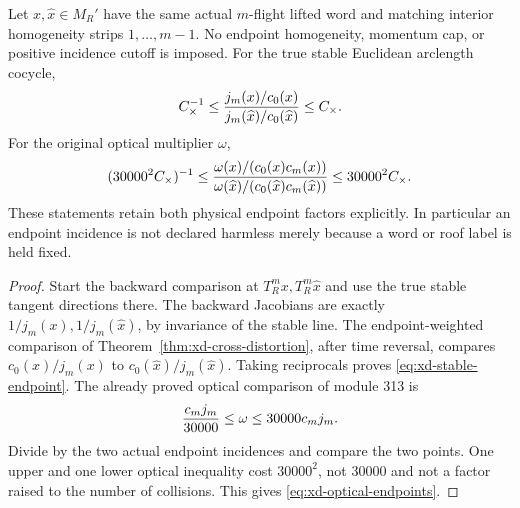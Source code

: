 \begin{corollary}
\label{cor:xd-normalized-cocycles}
Let $x,\widehat x\in M_R'$ have the same actual $m$-flight lifted
word and matching interior homogeneity strips $1,\ldots,m-1$.
No endpoint homogeneity, momentum cap, or positive incidence cutoff
is imposed.  For the true stable Euclidean arclength cocycle,
\begin{equation}\label{eq:xd-stable-endpoint}
 C_\times^{-1}\le
 {j_m(x)/c_0(x)\over j_m(\widehat x)/c_0(\widehat x)}
                                                        \le C_\times.
\end{equation}
For the original optical multiplier $\omega$,
\begin{equation}\label{eq:xd-optical-endpoints}
 (30000^2C_\times)^{-1}\le
 {\omega(x)/(c_0(x)c_m(x))\over
       \omega(\widehat x)/(c_0(\widehat x)c_m(\widehat x))}
                                            \le30000^2C_\times.
\end{equation}
These statements retain both physical endpoint factors explicitly.
In particular an endpoint incidence is not declared harmless merely
because a word or roof label is held fixed.
\end{corollary}

\begin{proof}
Start the backward comparison at $T_R^mx,T_R^m\widehat x$ and use
the true stable tangent directions there.  The backward Jacobians
are exactly $1/j_m(x),1/j_m(\widehat x)$, by invariance of the
stable line.  The endpoint-weighted comparison of
Theorem~\ref{thm:xd-cross-distortion}, after time reversal, compares
$c_0(x)/j_m(x)$ to $c_0(\widehat x)/j_m(\widehat x)$.
Taking reciprocals proves \eqref{eq:xd-stable-endpoint}.
The already proved optical comparison of module 313 is
\[
 {c_mj_m\over30000}\le\omega\le30000c_mj_m.
\]
Divide by the two actual endpoint incidences and compare the two
points.  One upper and one lower optical inequality cost $30000^2$,
not $30000$ and not a factor raised to the number of collisions.
This gives \eqref{eq:xd-optical-endpoints}.
\end{proof}

